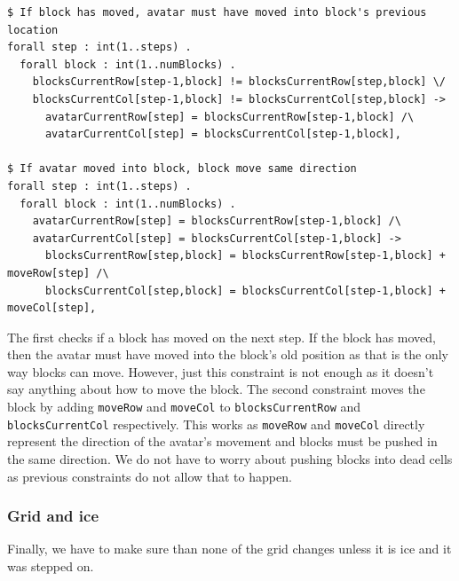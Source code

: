 \documentclass{article}
\begin{document}
\begin{lstlisting}[caption={Constraints for moving blocks}, captionpos=b]
$ If block has moved, avatar must have moved into block's previous location
forall step : int(1..steps) .
  forall block : int(1..numBlocks) .
    blocksCurrentRow[step-1,block] != blocksCurrentRow[step,block] \/
    blocksCurrentCol[step-1,block] != blocksCurrentCol[step,block] ->
      avatarCurrentRow[step] = blocksCurrentRow[step-1,block] /\
	  avatarCurrentCol[step] = blocksCurrentCol[step-1,block],

$ If avatar moved into block, block move same direction
forall step : int(1..steps) .
  forall block : int(1..numBlocks) .
    avatarCurrentRow[step] = blocksCurrentRow[step-1,block] /\
	avatarCurrentCol[step] = blocksCurrentCol[step-1,block] ->
	  blocksCurrentRow[step,block] = blocksCurrentRow[step-1,block] + moveRow[step] /\
	  blocksCurrentCol[step,block] = blocksCurrentCol[step-1,block] + moveCol[step],
\end{lstlisting}
The first checks if a block has moved on the next step. If the block has moved, then the avatar must have moved into the block's old position as that is the only way blocks can move. However, just this constraint is not enough as it doesn't say anything about how to move the block. The second constraint moves the block by adding \texttt{moveRow} and \texttt{moveCol} to \texttt{blocksCurrentRow} and \texttt{blocksCurrentCol} respectively. This works as \texttt{moveRow} and \texttt{moveCol} directly represent the direction of the avatar's movement and blocks must be pushed in the same direction. We do not have to worry about pushing blocks into dead cells as previous constraints do not allow that to happen. 


\subsubsection{Grid and ice}
Finally, we have to make sure than none of the grid changes unless it is ice and it was stepped on.
\end{document}

